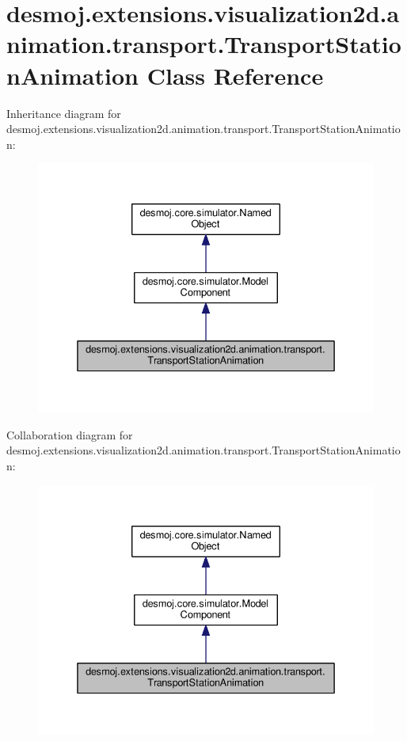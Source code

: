 \section{desmoj.\-extensions.\-visualization2d.\-animation.\-transport.\-Transport\-Station\-Animation Class Reference}
\label{classdesmoj_1_1extensions_1_1visualization2d_1_1animation_1_1transport_1_1_transport_station_animation}


Inheritance diagram for desmoj.\-extensions.\-visualization2d.\-animation.\-transport.\-Transport\-Station\-Animation\-:
\nopagebreak
\begin{figure}[H]
\begin{center}
\leavevmode
\includegraphics[width=334pt]{classdesmoj_1_1extensions_1_1visualization2d_1_1animation_1_1transport_1_1_transport_station_animation__inherit__graph}
\end{center}
\end{figure}


Collaboration diagram for desmoj.\-extensions.\-visualization2d.\-animation.\-transport.\-Transport\-Station\-Animation\-:
\nopagebreak
\begin{figure}[H]
\begin{center}
\leavevmode
\includegraphics[width=334pt]{classdesmoj_1_1extensions_1_1visualization2d_1_1animation_1_1transport_1_1_transport_station_animation__coll__graph}
\end{center}
\end{figure}
